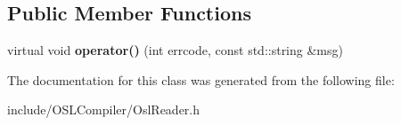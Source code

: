 \subsection*{Public Member Functions}
\begin{DoxyCompactItemize}
\item 
\hypertarget{class_o_s_l_c___error_handler_ab3fedae8bb9605f1fa40abb0394e3aa2}{virtual void {\bfseries operator()} (int errcode, const std\-::string \&msg)}\label{class_o_s_l_c___error_handler_ab3fedae8bb9605f1fa40abb0394e3aa2}

\end{DoxyCompactItemize}


The documentation for this class was generated from the following file\-:\begin{DoxyCompactItemize}
\item 
include/\-O\-S\-L\-Compiler/Osl\-Reader.\-h\end{DoxyCompactItemize}
